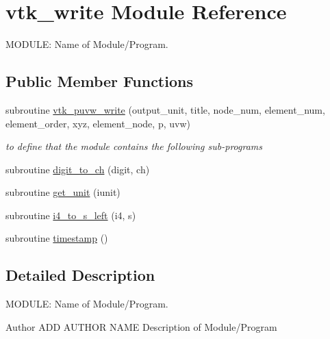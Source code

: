\hypertarget{classvtk__write}{\section{vtk\-\_\-write Module Reference}
\label{classvtk__write}
}


M\-O\-D\-U\-L\-E\-: Name of Module/\-Program.  


\subsection*{Public Member Functions}
\begin{DoxyCompactItemize}
\item 
subroutine \hyperlink{classvtk__write_ae0e24437ab2ab3888b974ad18faf82d9}{vtk\-\_\-puvw\-\_\-write} (output\-\_\-unit, title, node\-\_\-num, element\-\_\-num, element\-\_\-order, xyz, element\-\_\-node, p, uvw)
\begin{DoxyCompactList}\small\item\em to define that the module contains the following sub-\/programs \end{DoxyCompactList}\item 
subroutine \hyperlink{classvtk__write_a10a8f6e1ed00480f1a7ce84d7cbf517a}{digit\-\_\-to\-\_\-ch} (digit, ch)
\item 
subroutine \hyperlink{classvtk__write_a3a9f616764890e5348504a4634364e17}{get\-\_\-unit} (iunit)
\item 
subroutine \hyperlink{classvtk__write_a136ed0a5a2367893ebb93bed1b757b99}{i4\-\_\-to\-\_\-s\-\_\-left} (i4, s)
\item 
subroutine \hyperlink{classvtk__write_acd768e2181dd4969a07b5f03fde6b705}{timestamp} ()
\end{DoxyCompactItemize}


\subsection{Detailed Description}
M\-O\-D\-U\-L\-E\-: Name of Module/\-Program. 

\begin{DoxyAuthor}{Author}
A\-D\-D A\-U\-T\-H\-O\-R N\-A\-M\-E Description of Module/\-Program 
\end{DoxyAuthor}


